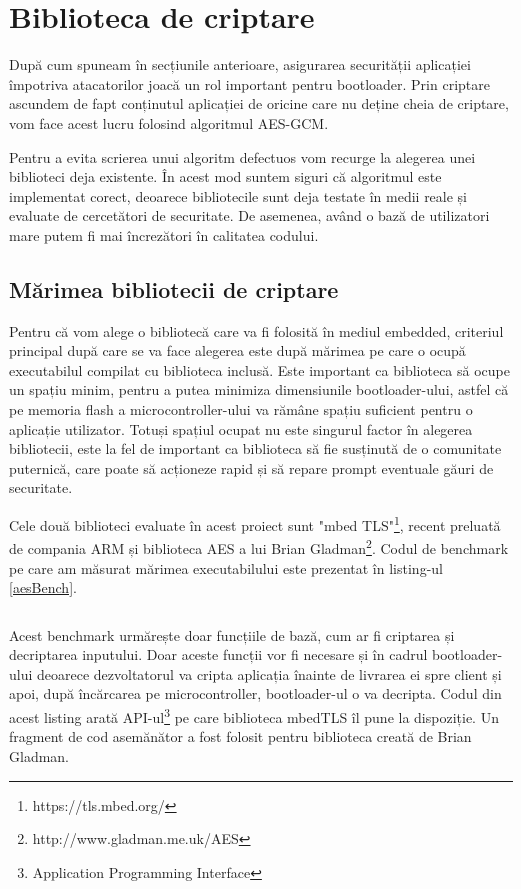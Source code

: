 \documentclass[12pt,a4paper,titlepage]{report}
\begin{document}
\section{Biblioteca de criptare}
După cum spuneam în secțiunile anterioare, asigurarea securității aplicației împotriva atacatorilor joacă un rol important pentru bootloader. Prin criptare ascundem de fapt conținutul aplicației de oricine care nu deține cheia de criptare, vom face acest lucru folosind algoritmul AES-GCM.

Pentru a evita scrierea unui algoritm defectuos vom recurge la alegerea unei biblioteci deja existente. În acest mod suntem siguri că algoritmul este implementat corect, deoarece bibliotecile sunt deja testate în medii reale și evaluate de cercetători de securitate. De asemenea, având o bază de utilizatori mare putem fi mai încrezători în calitatea codului.

\subsection{Mărimea bibliotecii de criptare}
Pentru că vom alege o bibliotecă care va fi folosită în mediul embedded, criteriul principal după care se va face alegerea este după mărimea pe care o ocupă executabilul compilat cu biblioteca inclusă. Este important ca biblioteca să ocupe un spațiu minim, pentru a putea minimiza dimensiunile bootloader-ului, astfel că pe memoria flash a microcontroller-ului va rămâne spațiu suficient pentru o aplicație utilizator. Totuși spațiul ocupat nu este singurul factor în alegerea bibliotecii, este la fel de important ca biblioteca să fie susținută de o comunitate puternică, care poate să acționeze rapid și să repare prompt eventuale găuri de securitate.

Cele două biblioteci evaluate în acest proiect sunt "mbed TLS"\footnote{https://tls.mbed.org/}, recent preluată de compania ARM și biblioteca AES a lui Brian Gladman\footnote{http://www.gladman.me.uk/AES}. Codul de benchmark pe care am măsurat mărimea executabilului este prezentat în listing-ul \ref{aesBench}.

\inputminted{c}{aes_bench_short.c}


Acest benchmark urmărește doar funcțiile de bază, cum ar fi criptarea și decriptarea inputului. Doar aceste funcții vor fi necesare și în cadrul bootloader-ului deoarece dezvoltatorul va cripta aplicația înainte de livrarea ei spre client și apoi, după încărcarea pe microcontroller, bootloader-ul o va decripta. Codul din acest listing arată API-ul\footnote{Application Programming Interface} pe care biblioteca mbedTLS îl pune la dispoziție. Un fragment de cod asemănător a fost folosit pentru biblioteca creată de Brian Gladman.
\end{document}
